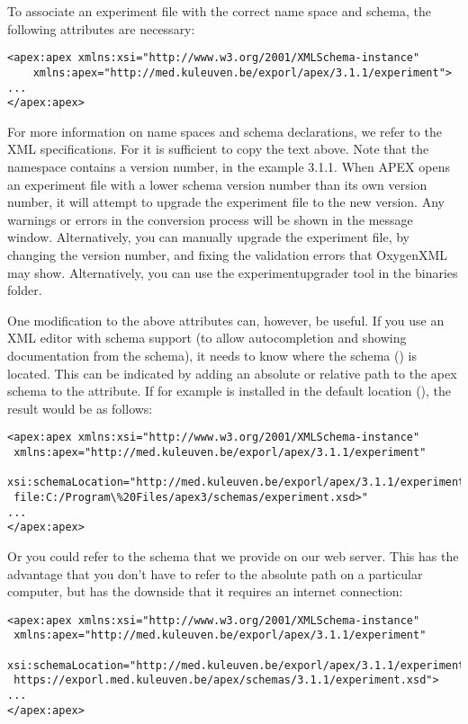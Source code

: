 To associate an experiment file with the correct name space and
schema, the following attributes are necessary:


\begin{lstlisting}
<apex:apex xmlns:xsi="http://www.w3.org/2001/XMLSchema-instance"
    xmlns:apex="http://med.kuleuven.be/exporl/apex/3.1.1/experiment">
...
</apex:apex>
\end{lstlisting}

For more information on name spaces and schema declarations, we
refer to the XML specifications. For \apex it is sufficient to
copy the text above. Note that the namespace contains a version number, in the example 3.1.1. When APEX opens an experiment file with a lower schema version number than its own version number, it will attempt to upgrade the experiment file to the new version. Any warnings or errors in the conversion process will be shown in the message window. Alternatively, you can manually upgrade the experiment file, by changing the version number, and fixing the validation errors that OxygenXML may show. Alternatively, you can use the experimentupgrader tool in the \apex binaries folder. 

One modification to the above attributes can, however, be useful.
If you use an XML editor with schema support (to allow
autocompletion and showing documentation from the schema), it
needs to know where the \apex schema ()
is located. This can be indicated by adding an absolute or
relative path to the apex schema to the
 attribute. If for example \apex is installed in the
default location (), the result
would be as follows:

\begin{lstlisting}
<apex:apex xmlns:xsi="http://www.w3.org/2001/XMLSchema-instance"
 xmlns:apex="http://med.kuleuven.be/exporl/apex/3.1.1/experiment" 
 xsi:schemaLocation="http://med.kuleuven.be/exporl/apex/3.1.1/experiment 
 file:C:/Program\%20Files/apex3/schemas/experiment.xsd>"
...
</apex:apex>
\end{lstlisting}

Or you could refer to the schema that we provide on our web server. This has the advantage that you don't have to refer to the absolute path on a particular computer, but has the downside that it requires an internet connection:

\begin{lstlisting}
<apex:apex xmlns:xsi="http://www.w3.org/2001/XMLSchema-instance" 
 xmlns:apex="http://med.kuleuven.be/exporl/apex/3.1.1/experiment" 
 xsi:schemaLocation="http://med.kuleuven.be/exporl/apex/3.1.1/experiment 
 https://exporl.med.kuleuven.be/apex/schemas/3.1.1/experiment.xsd">
...
</apex:apex>
\end{lstlisting}


